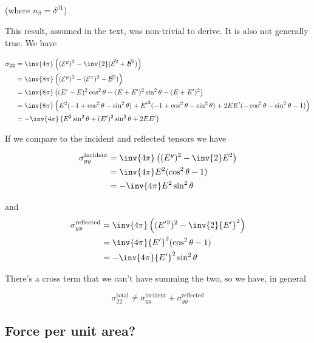 (where $n_\beta = \delta^{\beta 1}$)

This result, assumed in the text, was non-trivial to derive.  It is also not generally true.  We have 

\begin{align*}
\sigma_{2 2} 
&= \inv{4 \pi} \left( (\mathcal{E}^y)^2 - \inv{2} ( \vec{\mathcal{E}}^2 + \vec{\mathcal{B}}^2 ) \right) \\
&= \inv{8 \pi} \left( (\mathcal{E}^y)^2 - (\mathcal{E}^x)^2 - \vec{\mathcal{B}}^2 ) \right) \\
&= \inv{8 \pi} \left( 
(E' - E)^2 \cos^2\theta - (E + E')^2 \sin^2\theta - (E + E')^2
\right) \\
&= \inv{8 \pi} \left( 
E^2 ( -1 + \cos^2 \theta - \sin^2\theta )
+{E'}^2 ( -1 + \cos^2 \theta - \sin^2\theta )
+ 2 E E' ( -\cos^2\theta - \sin^2\theta -1 ) \right) \\
&= -\inv{4 \pi} \left( E^2 \sin^2 \theta + (E')^2 \sin^2 \theta + 2 E E' \right)
\end{align*}

If we compare to the incident and reflected tensors we have

\begin{align*}
\sigma_{y y}^{\text{incident}} 
&= \inv{4 \pi} \left( (E^y)^2 -\inv{2} E^2 \right) \\
&= \inv{4 \pi} E^2 ( \cos^2\theta - 1 ) \\
&= -\inv{4 \pi} E^2 \sin^2\theta 
\end{align*}

and
\begin{align*}
\sigma_{y y}^{\text{reflected}} 
&= \inv{4 \pi} \left( ({E'}^y)^2 -\inv{2} {E'}^2 \right) \\
&= \inv{4 \pi} {E'}^2 ( \cos^2\theta - 1 ) \\
&= -\inv{4 \pi} {E'}^2 \sin^2\theta 
\end{align*}

There's a cross term that we can't have summing the two, so we have, in general

\begin{equation}\label{eqn:relativisticElectrodynamicsT9:n}
\sigma_{2 2}^{\text{total}} \ne 
\sigma_{y y}^{\text{incident}} 
+\sigma_{y y}^{\text{reflected}} 
\end{equation}

\subsection{Force per unit area?}

